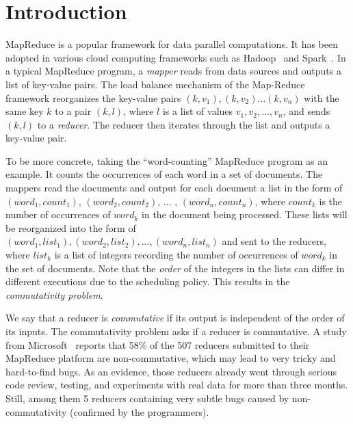 
\section{Introduction}
MapReduce is a  popular framework for data parallel computations. It has been adopted in various cloud computing frameworks such as Hadoop~\cite{Hadoop} and Spark~\cite{Spark}. In a typical MapReduce program, a \emph{mapper} reads from data sources and outputs a list of key-value pairs. 
The load balance mechanism of the Map-Reduce framework reorganizes the key-value pairs $(k, v_1), (k,v_2)\ldots(k,v_n)$ with the same key $k$ to a pair $(k,l)$, where $l$ is a list of values $v_1,v_2,\ldots,v_n$, and sends $(k,l)$ to a \emph{reducer}. The reducer then iterates through the list and outputs a key-value pair.

To be more concrete, taking the ``word-counting'' MapReduce program as an example. It counts the occurrences of each word in a set of documents. The mappers read the documents and output for each document a list in the form of $(word_1, count_1)$, $(word_2, count_2)$, $\ldots$ , $(word_n, count_n)$, where $count_k$ is the number of occurrences of $word_k$ in the document being processed. These lists will be reorganized into the form of $(word_1, list_1), (word_2,list_2), \ldots, (word_n,list_n)$ and sent to the reducers, where $list_k$ is a list of integers recording the number of occurrences of $word_k$ in the set of documents. Note that the \emph{order} of the integers in the lists can differ in different executions due to the scheduling policy. This results in the \emph{commutativity problem}.

We say that a reducer is \emph{commutative} if its output is independent of the order of its inputs. The commutativity problem asks if a reducer is commutative. A study from Microsoft~\cite{XZZ+14} reports that 58\% of the 507 reducers submitted to their MapReduce platform are non-commutative, which may lead to very tricky and hard-to-find bugs.
As an evidence, those reducers already went through serious code review, testing, and experiments with real data for more than three months. Still, among them 5 reducers containing very subtle bugs caused by non-commutativity (confirmed by the programmers). 

